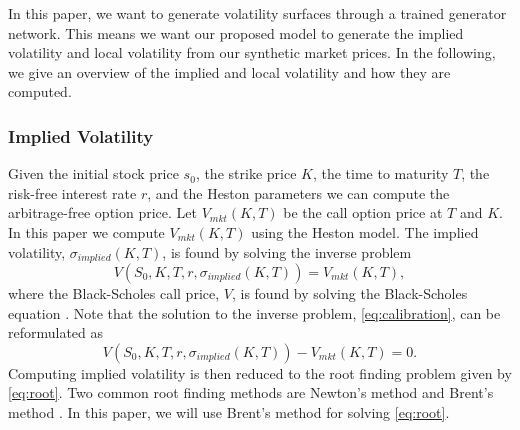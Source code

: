 \documentclass{article}
\theoremstyle{plain}%
\theoremstyle{definition}
\theoremstyle{remark}
\begin{document}
In this paper, we want to generate volatility surfaces through a trained generator network. This means we want our proposed model to generate the implied volatility and local volatility from our synthetic market prices.  In the following, we give an overview of the implied and local volatility and how they are computed.

\subsubsection{Implied Volatility}
Given the initial stock price $s_0$, the strike price $K$, the time to maturity $T$, the risk-free interest rate $r$, and the Heston parameters we can compute the arbitrage-free option price. Let $V_{mkt}(K,T)$ be the call option price at $T$ and $K$. In this paper we compute $V_{mkt}(K,T)$ using the Heston model. The implied volatility, $\sigma_{implied}(K,T)$, is found by solving the inverse problem
\begin{equation}
  V(S_0, K, T, r,\sigma_{implied}(K,T)) = V_{mkt}(K,T),
  \label{eq:calibration}
\end{equation}where the Black-Scholes call price, $V$, is found by solving the Black-Scholes equation \citep{liu-2019-1, gatheral-2001-1}. Note that the solution to the inverse problem, \eqref{eq:calibration}, can be reformulated as
\begin{equation}
V(S_0,K,T,r,\sigma_{implied}(K,T)) - V_{mkt}(K,T) =0.
\label{eq:root}
\end{equation}
Computing implied volatility is then reduced to the root finding problem given by \eqref{eq:root}. Two common root finding methods are Newton's method and Brent's method \citep{brent-1973}. In this paper, we will use Brent's method for solving \eqref{eq:root}.
\end{document}
